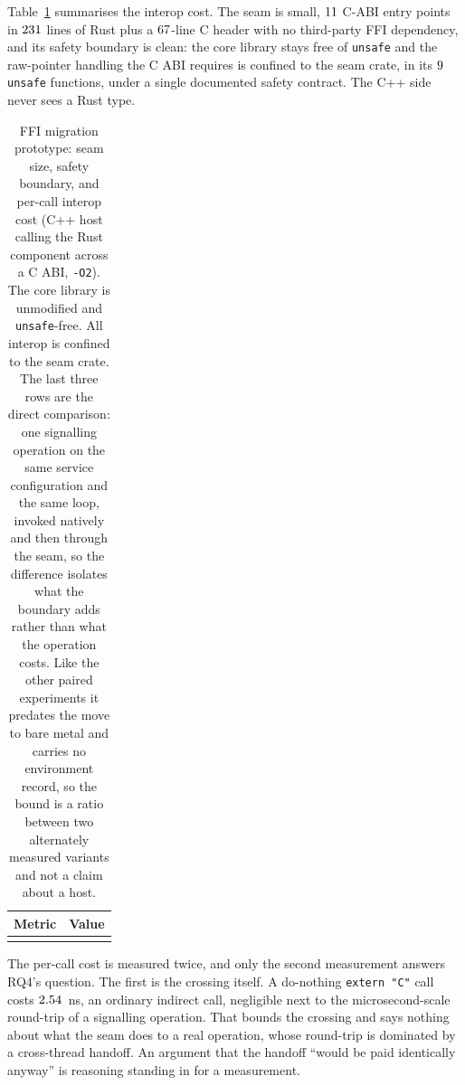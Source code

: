 \documentclass[english,oneside,a4paper,censored,csm,software-track-2020]{HYthesisML}
\begin{document}
Table~\ref{tab:ffi} summarises the interop cost. The seam is small, $11$ C-ABI entry
points in $231$ lines of Rust plus a $67$-line C header with no third-party
FFI dependency, and its safety boundary is clean: the core library stays free of \texttt{unsafe}
and the raw-pointer handling the C ABI requires is confined to the seam crate, in its
$9$ \texttt{unsafe} functions, under a single documented safety contract. The C++ side
never sees a Rust type.

\begin{table}[H]
\centering
\caption[FFI migration prototype: seam size, safety, and cost]{FFI migration prototype: seam size, safety boundary, and per-call interop cost
(C++ host calling the Rust component across a C ABI, \texttt{-O2}). The core library is
unmodified and \texttt{unsafe}-free. All interop is confined to the seam crate. The last
three rows are the direct comparison: one signalling operation on the same service
configuration and the same loop, invoked natively and then through the seam, so the
difference isolates what the boundary adds rather than what the operation
costs. Like the other paired experiments it predates the move to bare metal and carries no
environment record, so the bound is a ratio between two alternately measured variants and not a claim
about a host.\label{tab:ffi}}
\begin{tabular}{l r}
\hline\hline
Metric & Value \\
\hline
\\
\hline
\end{tabular}
\end{table}

The per-call cost is measured twice, and only the second measurement answers RQ4's question. The
first is the crossing itself. A do-nothing \texttt{extern "C"} call costs $2.54$~ns, an
ordinary indirect call, negligible next to the microsecond-scale round-trip of a signalling
operation. That bounds the crossing and says nothing about what the seam does to a real
operation, whose round-trip is dominated by a cross-thread handoff. An argument that the handoff
``would be paid identically anyway'' is reasoning standing in for a measurement.
\end{document}
